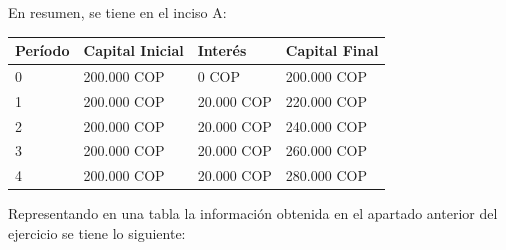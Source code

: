 En resumen, se tiene en el inciso A:
\begin{table}[htbp]
   \begin{center}
      \begin{tabular}{|l|l|l|l|}
         \hline
         Período & Capital Inicial & Interés     & Capital Final \\
         \hline
         0       & 200.000 COP &  0 COP      & 200.000 COP  \\ \hline
         1       & 200.000 COP &  20.000 COP & 220.000 COP  \\ \hline
         2       & 200.000 COP &  20.000 COP & 240.000 COP  \\ \hline
         3       & 200.000 COP &  20.000 COP & 260.000 COP  \\ \hline
         4       & 200.000 COP &  20.000 COP & 280.000 COP  \\ \hline
      \end{tabular}
      \label{tabla:interesSimple1}
   \end{center}
\end{table}

\clearpage



Representando en una tabla la información obtenida en el apartado anterior del ejercicio se tiene lo siguiente:\\


